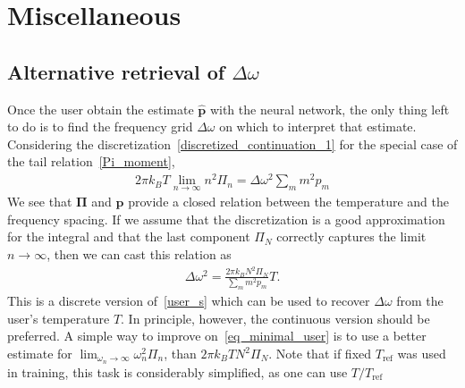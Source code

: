 \documentclass[notitlepage, 11pt, nofootinbib]{revtex4-1}
\renewcommand{\vec}[1]{\bm{#1}}
\begin{document}
\section{Miscellaneous}
\subsection{Alternative retrieval of $\Delta\omega$}

Once the user obtain the estimate $\hat{\vec p}$ with the neural network, the only thing left to do is to find the frequency grid $\Delta\omega$ on which to interpret that estimate. Considering the discretization~\eqref{discretized_continuation_1} for the special case of the tail relation~\eqref{Pi_moment},
\begin{align}
    2\pi k_B T \lim_{n\rightarrow \infty}n^2 \Pi_n = \Delta\omega^2 \sum_m m^2 p_m
\end{align}
We see that $\vec \Pi$ and $\vec p$ provide a closed relation between the temperature and the frequency spacing. If we assume that the discretization is a good approximation for the integral and that the last component $\Pi_N$ correctly captures the limit $n\rightarrow\infty$, then we can cast this relation as
\begin{align}
    \Delta\omega^2 = 
    \frac{
        2\pi k_B 
        N^2 \Pi_N
    }{
        \sum_m m^2 p_m
    }
    T.
\label{eq_minimal_user}
\end{align}
This is a discrete version of~\eqref{user_s} which can be used to recover $\Delta\omega$ from the user's temperature $T$. In principle, however, the continuous version should be preferred. A simple way to improve on~\eqref{eq_minimal_user} is to use a better estimate for $\lim_{\omega_n\rightarrow \infty}\omega_n^2 \Pi_n$, than $2\pi k_B T N^2\Pi_N$. Note that if fixed $T_{\text{ref}}$ was used in training, this task is considerably simplified, as one can use $T/T_{\text{ref}}$
\end{document}
